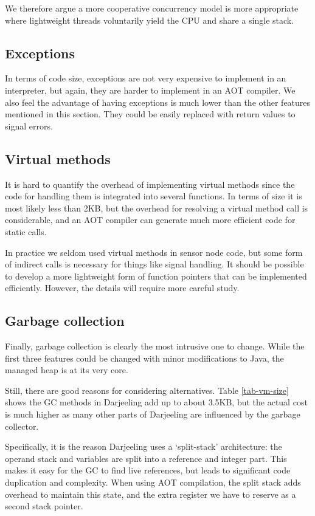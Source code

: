 We therefore argue a more cooperative concurrency model is more appropriate where lightweight threads voluntarily yield the CPU and share a single stack.

\subsection{Exceptions}
In terms of code size, exceptions are not very expensive to implement in an interpreter, but again, they are harder to implement in an AOT compiler. We also feel the advantage of having exceptions is much lower than the other features mentioned in this section. They could be easily replaced with return values to signal errors.

\subsection{Virtual methods}
It is hard to quantify the overhead of implementing virtual methods since the code for handling them is integrated into several functions. In terms of size it is most likely less than 2KB, but the overhead for resolving a virtual method call is considerable, and an AOT compiler can generate much more efficient code for static calls.

In practice we seldom used virtual methods in sensor node code, but some form of indirect calls is necessary for things like signal handling. It should be possible to develop a more lightweight form of function pointers that can be implemented efficiently. However, the details will require more careful study.

\subsection{Garbage collection}
Finally, garbage collection is clearly the most intrusive one to change. While the first three features could be changed with minor modifications to Java, the managed heap is at its very core.

Still, there are good reasons for considering alternatives. Table \ref{tab-vm-size} shows the GC methods in Darjeeling add up to about 3.5KB, but the actual cost is much higher as many other parts of Darjeeling are influenced by the garbage collector.

Specifically, it is the reason Darjeeling uses a `split-stack' architecture: the operand stack and variables are split into a reference and integer part. This makes it easy for the GC to find live references, but leads to significant code duplication and complexity. When using AOT compilation, the split stack adds overhead to maintain this state, and the extra register we have to reserve as a second stack pointer.



